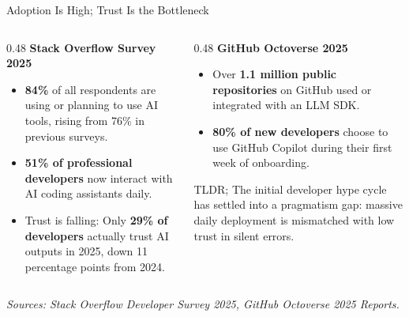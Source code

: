 \begin{frame}[shrink=5]{Adoption Is High; Trust Is the Bottleneck}
  \begin{columns}[T, onlytextwidth]
    \begin{column}{0.48\textwidth}
      \textbf{Stack Overflow Survey 2025}
      \begin{itemize}\setlength{\itemsep}{2pt}
        \item \textbf{84\%} of all respondents are using or planning to use AI tools, rising from 76\% in previous surveys.
        \item \textbf{51\% of professional developers} now interact with AI coding assistants daily.
        \item \alert{Trust is falling}: Only \textbf{29\% of developers} actually trust AI outputs in 2025, down 11 percentage points from 2024.
      \end{itemize}
    \end{column}
    \hfill
    \begin{column}{0.48\textwidth}
      \textbf{GitHub Octoverse 2025}
      \begin{itemize}\setlength{\itemsep}{2pt}
        \item Over \textbf{1.1 million public repositories} on GitHub used or integrated with an LLM SDK.
        \item \textbf{80\% of new developers} choose to use GitHub Copilot during their first week of onboarding.
      \end{itemize}
      \vspace{0.4em}
      \begin{block}{TLDR;}
        The initial developer hype cycle has settled into a pragmatism gap: massive daily deployment is mismatched with low trust in silent errors.
      \end{block}
    \end{column}
  \end{columns}
  \vspace{0.6em}
  \centering\tiny\textit{Sources: Stack Overflow Developer Survey 2025, GitHub Octoverse 2025 Reports.}
\end{frame}

